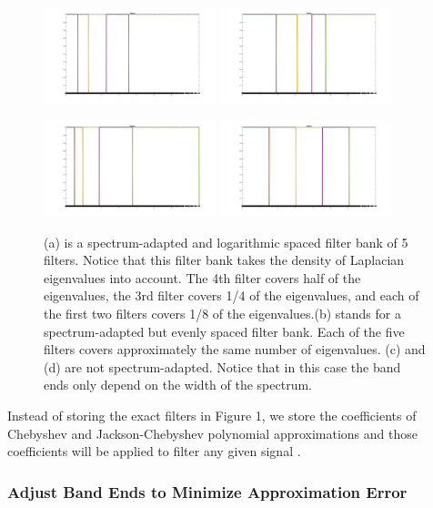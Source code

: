 \documentclass[a4paper]{article}
\theoremstyle{definition}
\begin{document}
\begin{figure}[h]
\centering
\includegraphics[width = 5cm]{filter_bank_1}
\includegraphics[width = 5cm]{filter_bank_2}

\includegraphics[width = 5cm]{filter_bank_4}
\includegraphics[width = 5cm]{filter_bank_3}


\caption{(a) is a spectrum-adapted and logarithmic spaced filter bank of 5 filters. Notice that this filter bank takes the density of Laplacian eigenvalues into account. The 4th filter covers half of the eigenvalues, the 3rd filter covers 1/4 of the eigenvalues, and each of the first two filters covers 1/8 of the eigenvalues.(b) stands for a spectrum-adapted but evenly spaced filter bank. Each of the five filters covers approximately the same number of eigenvalues. (c) and (d) are not spectrum-adapted. Notice that in this case the band ends only depend on the width of the spectrum.}
\end{figure}

Instead of storing the exact filters in Figure 1, we store the coefficients of Chebyshev and Jackson-Chebyshev polynomial approximations\cite{ShumanSIPN2018} and those coefficients will be applied to filter any given signal  \cite{shuman2013spectrum}.


\subsubsection{Adjust Band Ends to Minimize Approximation Error}
\end{document}
